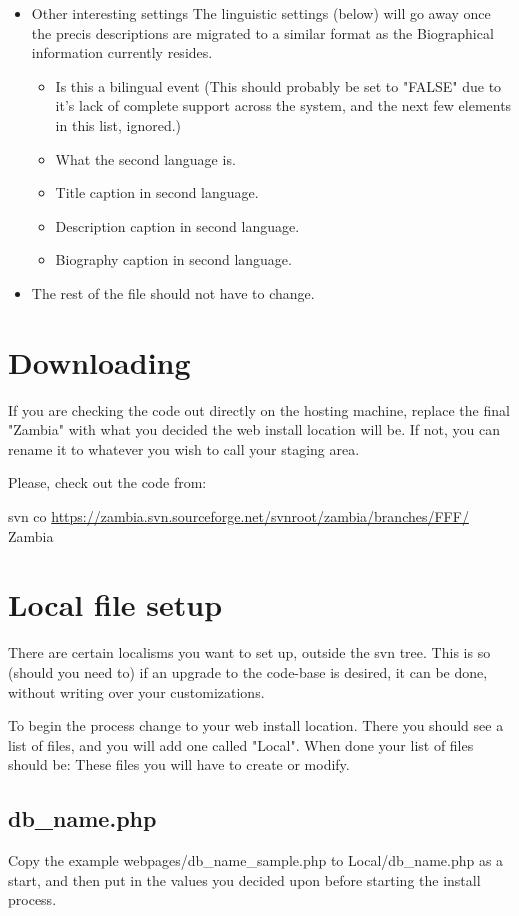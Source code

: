 \documentclass[captions=tablesignature]{scrartcl}
\begin{document}
\begin{itemize}
\item Other interesting settings
\label{sec-1-2-4-5}
The linguistic settings (below) will go away once the precis
descriptions are migrated to a similar format as the Biographical
information currently resides.
\begin{itemize}
\item Is this a bilingual event (This should probably be set to
"FALSE" due to it's lack of complete support across the system,
and the next few elements in this list, ignored.)
\item What the second language is.
\item Title caption in second language.
\item Description caption in second language.
\item Biography caption in second language.
\end{itemize}

\item The rest of the file should not have to change.
\label{sec-1-2-4-6}
\end{itemize}

\section{Downloading}
\label{sec-2}
If you are checking the code out directly on the hosting machine,
replace the final "Zambia" with what you decided the web install
location will be.  If not, you can rename it to whatever you wish to
call your staging area.

Please, check out the code from:

svn co \url{https://zambia.svn.sourceforge.net/svnroot/zambia/branches/FFF/} Zambia
\section{Local file setup}
\label{sec-3}
There are certain localisms you want to set up, outside the svn
tree. This is so (should you need to) if an upgrade to the code-base
is desired, it can be done, without writing over your
customizations.

To begin the process change to your web install location.  There you
should see a list of files, and you will add one called "Local".
When done your list of files should be:
These files you will have to create or modify.
\subsection{db\_name.php}
\label{sec-3-1}
Copy the example webpages/db\_name\_sample.php to Local/db\_name.php
as a start, and then put in the values you decided upon before
starting the install process.
\end{document}
